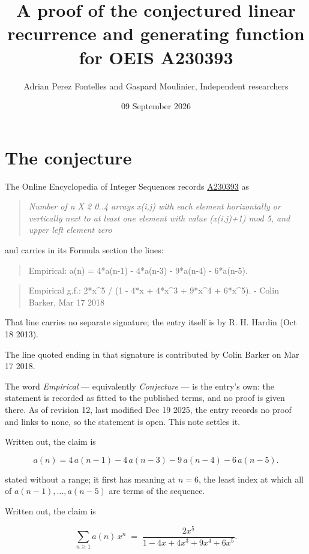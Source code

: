 \documentclass[11pt]{article}
\title{A proof of the conjectured linear recurrence and generating function for OEIS A230393}
\author{Adrian Perez Fontelles and Gaspard Moulinier, Independent researchers}
\date{09 September 2026}
\theoremstyle{definition}
\begin{document}
\maketitle
\section{The conjecture}

The Online Encyclopedia of Integer Sequences records \href{https://oeis.org/A230393}{A230393} as

\begin{quote}\itshape Number of n X 2 0..4 arrays x(i,j) with each element horizontally or vertically next to at least one element with value (x(i,j)+1) mod 5, and upper left element zero\end{quote}

and carries in its Formula section the lines:

\begin{quote}\ttfamily Empirical: a(n) = 4*a(n-1) - 4*a(n-3) - 9*a(n-4) - 6*a(n-5).\end{quote}

\begin{quote}\ttfamily Empirical g.f.: 2*x\textasciicircum{}5 / (1 - 4*x + 4*x\textasciicircum{}3 + 9*x\textasciicircum{}4 + 6*x\textasciicircum{}5). - Colin Barker, Mar 17 2018\end{quote}

That line carries no separate signature; the entry itself is by R. H. Hardin (Oct 18 2013).

The line quoted ending in that signature is contributed by Colin Barker on Mar 17 2018.

The word {\itshape Empirical} --- equivalently {\itshape Conjecture} --- is the entry's own: the statement is recorded as fitted to the published terms, and no proof is given there. As of revision 12, last modified Dec 19 2025, the entry records no proof and links to none, so the statement is open. This note settles it.

Written out, the claim is

\[a(n) = 4\,a(n-1) - 4\,a(n-3) - 9\,a(n-4) - 6\,a(n-5).\]

stated without a range; it first has meaning at $n = 6$, the least index at which all of $a(n-1),\dots,a(n-5)$ are terms of the sequence.

Written out, the claim is

\[\sum_{n \ge 1} a(n)\,x^n \;=\; \frac{2x^{5}}{1 - 4x + 4x^{3} + 9x^{4} + 6x^{5}}.\]
\end{document}
